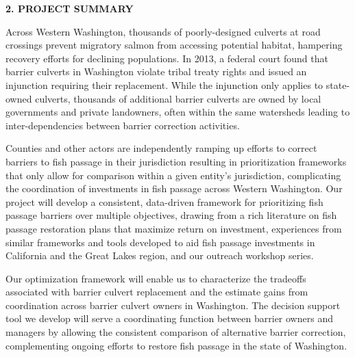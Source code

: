 \documentclass[12pt]{elsarticle}
\begin{document}
\begin{center} \textbf{2. PROJECT SUMMARY} \end{center}




			Across Western Washington, thousands of poorly-designed culverts at road crossings prevent migratory salmon from accessing potential habitat, hampering recovery efforts for declining populations. In 2013, a federal court found that barrier culverts in Washington violate tribal treaty rights and issued an injunction requiring their replacement. While the injunction only applies to state-owned culverts, thousands of additional barrier culverts are owned by local governments and private landowners, often within the same watersheds leading to inter-dependencies between barrier correction activities. 
			
			Counties and other actors are independently ramping up efforts to correct barriers to fish passage in their jurisdiction resulting in prioritization frameworks that only allow for comparison within a given entity's jurisdiction, complicating the coordination of investments in fish passage across Western Washington. Our project will develop a consistent, data-driven framework for prioritizing fish passage barriers over multiple objectives, drawing from a rich literature on fish passage restoration plans that maximize return on investment, experiences from similar frameworks and tools developed to aid fish passage investments in California and the Great Lakes region, and our outreach workshop series. 
			
			Our optimization framework will enable us to characterize the tradeoffs associated with barrier culvert replacement and the estimate gains from coordination across barrier culvert owners in Washington. The decision support tool we develop will serve a coordinating function between barrier owners and managers by allowing the consistent comparison of alternative barrier correction, complementing ongoing efforts to restore fish passage in the state of Washington.
\end{document}
